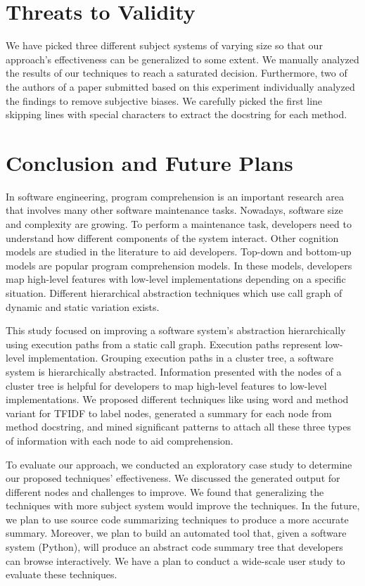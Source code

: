 \section{Threats to Validity}

We have picked three different subject systems of varying size so that our approach's effectiveness can be generalized to some extent. We manually analyzed the results of our techniques to reach a saturated decision. Furthermore, two of the authors of a paper submitted based on this experiment individually analyzed the findings to remove subjective biases. We carefully picked the first line skipping lines with special characters to extract the docstring for each method. 

\section{Conclusion and Future Plans}
In software engineering, program comprehension is an important research area that involves many other software maintenance tasks. Nowadays, software size and complexity are growing. To perform a maintenance task, developers need to understand how different components of the system interact. Other cognition models are studied in the literature to aid developers. Top-down and bottom-up models are popular program comprehension models. In these models, developers map high-level features with low-level implementations depending on a specific situation. Different hierarchical abstraction techniques which use call graph of dynamic and static variation exists. 

This study focused on improving a software system's abstraction hierarchically using execution paths from a static call graph. Execution paths represent low-level implementation. Grouping execution paths in a cluster tree, a software system is hierarchically abstracted. Information presented with the nodes of a cluster tree is helpful for developers to map high-level features to low-level implementations. We proposed different techniques like using word and method variant for TFIDF to label nodes, generated a summary for each node from method docstring, and mined significant patterns to attach all these three types of information with each node to aid comprehension.

To evaluate our approach, we conducted an exploratory case study to determine our proposed techniques' effectiveness. We discussed the generated output for different nodes and challenges to improve. We found that generalizing the techniques with more subject system would improve the techniques. In the future, we plan to use source code summarizing techniques \cite{wan2018improvingCodeSummary, ahmad2020transformerCodeSummary, zhu2019automaticSummaryReview} to produce a more accurate summary. Moreover, we plan to build an automated tool that, given a software system (Python), will produce an abstract code summary tree that developers can browse interactively. We have a plan to conduct a wide-scale user study to evaluate these techniques.
